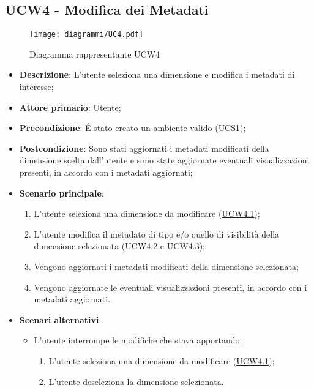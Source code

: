 \subsection{UCW4 - Modifica dei Metadati}
\label{sub:ucw4}

\begin{figure}[h]
    \centering
    \texttt{[image: diagrammi/UC4.pdf]}
    \caption{Diagramma rappresentante UCW4}
    \label{fig:UCW4}
\end{figure}

\begin{itemize}
    \item \textbf{Descrizione}: L’utente seleziona una dimensione e modifica i metadati di interesse;

    \item \textbf{Attore primario}: Utente;

    \item \textbf{Precondizione}:   É stato creato un ambiente valido (\hyperref[sub:ucs1]{UCS1});
    \item \textbf{Postcondizione}:  Sono stati aggiornati i metadati modificati della dimensione scelta dall'utente e
          sono state aggiornate eventuali visualizzazioni presenti, in accordo con i metadati aggiornati;

    \item \textbf{Scenario principale}:
          \begin{enumerate}
              \item L'utente seleziona una dimensione da modificare (\hyperref[ssub:ucw4.1]{UCW4.1});
              \item L'utente modifica il metadato di tipo e/o quello di visibilità della dimensione selezionata
                    (\hyperref[ssub:ucw4.2]{UCW4.2} e \hyperref[ssub:ucw4.3]{UCW4.3});
              \item Vengono aggiornati i metadati modificati della dimensione selezionata;
              \item Vengono aggiornate le eventuali visualizzazioni presenti, in accordo con i metadati
                    aggiornati.
          \end{enumerate}

    \item \textbf{Scenari alternativi}:
          \begin{itemize}
              \item L'utente interrompe le modifiche che stava apportando:
                    \begin{enumerate}
                        \item L'utente seleziona una dimensione da modificare (\hyperref[ssub:ucw4.1]{UCW4.1});
                        \item L'utente deseleziona la dimensione selezionata.
                    \end{enumerate}
          \end{itemize}
\end{itemize}

